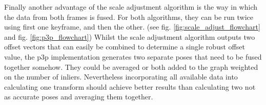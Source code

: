 
Finally another advantage of the scale adjustment algorithm is the way in which the data from both frames is fused.  For both algorithms, they can be run twice using first one keyframe, and then the other. (see fig. \ref{fig:scale_adjust_flowchart} and fig. \ref{fig:p3p_flowchart})  Whilst the scale adjustment algorithm outputs two offset vectors that can easily be combined to determine a single robust offset value, the p3p implementation generates two separate poses that need to be fused together somehow.  They could be averaged or both added to the graph weighted on the number of inliers. Nevertheless incorporating all available data into calculating one transform should achieve better results than calculating two not as accurate poses and averaging them together.

